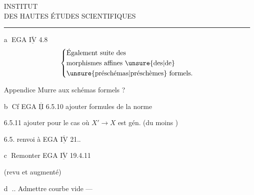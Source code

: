 \begin{center}
INSTITUT\\
DES HAUTES ÉTUDES SCIENTIFIQUES\\[-.3ex]
\rule{1.3cm}{.4pt}
\end{center}

\textcircled{a} \quad {} EGA $\underline{\overline{\mathrm{IV}}}$ 4.8
\[
\left\{\begin{aligned}
&\text{Également suite des}\\
&\text{morphismes affines \unsure{des|de}}\\
&\text{\unsure{préschémas|préschèmes} formels.}
\end{aligned}\right.
\]

{\reversemarginpar\margin{!}}Appendice  Murre aux schémas formels ?

\textcircled{b} \quad Cf EGA $\underline{\overline{\mathrm{II}}}$ 6.5.10 ajouter formules de la norme

6.5.11 ajouter  pour le cas où $X'\to X$ est gén.  (du moins )

6.5. renvoi à EGA $\underline{\overline{\mathrm{IV}}}$ 21..

\textcircled{c} \quad Remonter EGA $\underline{\overline{\mathrm{IV}}}$ 19.4.11

(revu et augmenté)

\textcircled{d} .. Admettre courbe vide ---

